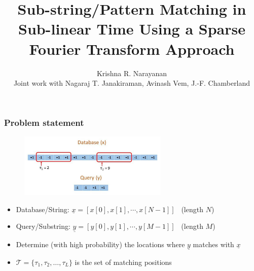 \documentclass[10pt,xcolor=table]{beamer}
\newcommand{\xv}{\underline{x}}
\newcommand{\yv}{\underline{y}}
\begin{document}
\title{Sub-string/Pattern Matching in Sub-linear Time Using a Sparse Fourier Transform Approach}
\author{ Krishna R. Narayanan \\
Joint work with Nagaraj T. Janakiraman, Avinash Vem, J.-F. Chamberland \\
}
\date{}
\frame{\titlepage}
\begin{frame}\frametitle{Problem statement}
 	\vspace{-0.4cm}
	\begin{figure}[t]
		\centering
		\includegraphics[width=2.8in]{Pattern_matching_ex.pdf}
	\end{figure}
	\vspace{-10pt}
	\begin{block}{}
\begin{itemize}\itemsep5pt
	\item {\color{blue} Database/String}: $\xv = [x[0], x[1], \cdots, x[N-1]]$ \ (length $N$)
	\item { \color{blue} Query/Substring}: $\yv = [y[0], y[1], \cdots, y[M-1]]$ \ (length $M$)
    \item Determine ({\color{blue}with high probability}) the locations where $\yv$ matches with $\xv$
    \item $\mathcal{T} = \{ \tau_1, \tau_2, \ldots, \tau_L \}$ is the set of matching positions
\end{itemize}
\end{block}


\end{frame}
\end{document}
